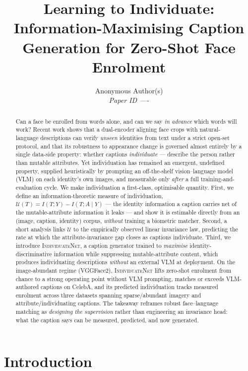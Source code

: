 \documentclass[10pt,twocolumn,letterpaper]{article}
\title{\textbf{Learning to Individuate: Information-Maximising Caption\\
Generation for Zero-Shot Face Enrolment}}
\author{Anonymous Author(s)\\ \textit{Paper ID ----}}
\date{}
\newcommand{\U}{\mathcal{U}}
\newcommand{\method}{\textsc{IndividuateNet}}
\begin{document}
\maketitle

\begin{abstract}
Can a face be enrolled from words alone, and can we say \emph{in advance} which words will
work? Recent work shows that a dual-encoder aligning face crops with natural-language
descriptions can verify \emph{unseen} identities from text under a strict open-set protocol,
and that its robustness to appearance change is governed almost entirely by a single data-side
property: whether captions \emph{individuate} --- describe the person rather than mutable
attributes. Yet individuation has remained an emergent, undefined property, supplied
heuristically by prompting an off-the-shelf vision--language model (VLM) on each identity's own
images, and measurable only \emph{after} a full training-and-evaluation cycle. We make
individuation a first-class, optimisable quantity. First, we define an information-theoretic
measure of individuation, $\U(T)=I(T;Y)-I(T;A\mid Y)$ --- the identity information a caption
carries net of the mutable-attribute information it leaks --- and show it is estimable directly
from an (image, caption, identity) corpus, \emph{without} training a biometric matcher. Second,
a short analysis links $\U$ to the empirically observed linear invariance law, predicting the
rate at which the attribute-invariance gap closes as captions individuate. Third, we introduce
\method, a caption generator trained to \emph{maximise} identity-discriminative information
while suppressing mutable-attribute content, which produces individuating descriptions
\emph{without} an external VLM at deployment. On the image-abundant regime (VGGFace2), \method{}
lifts zero-shot enrolment from chance to a strong operating point without VLM prompting, matches
or exceeds VLM-authored captions on CelebA, and its predicted individuation tracks measured
enrolment across three datasets spanning sparse/abundant imagery and attribute/individuating
captions. The takeaway reframes robust face--language matching as \emph{designing the
supervision} rather than engineering an invariance head: what the caption says can be measured,
predicted, and now generated.
\end{abstract}

\section{Introduction}
\end{document}
